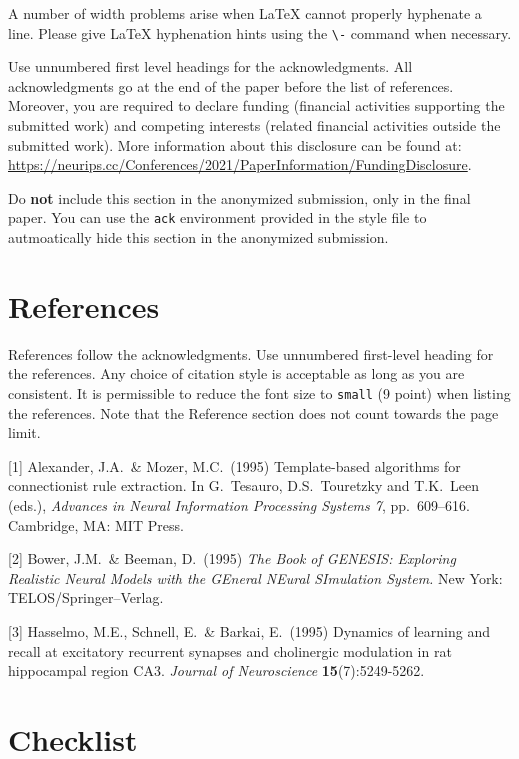 \documentclass{article}
\begin{document}
A number of width problems arise when \LaTeX{} cannot properly hyphenate a
line. Please give LaTeX hyphenation hints using the \verb+\-+ command when
necessary.

\begin{ack}
Use unnumbered first level headings for the acknowledgments. All acknowledgments
go at the end of the paper before the list of references. Moreover, you are required to declare
funding (financial activities supporting the submitted work) and competing interests (related financial activities outside the submitted work).
More information about this disclosure can be found at: \url{https://neurips.cc/Conferences/2021/PaperInformation/FundingDisclosure}.

Do {\bf not} include this section in the anonymized submission, only in the final paper. You can use the \texttt{ack} environment provided in the style file to autmoatically hide this section in the anonymized submission.
\end{ack}

\section*{References}

References follow the acknowledgments. Use unnumbered first-level heading for
the references. Any choice of citation style is acceptable as long as you are
consistent. It is permissible to reduce the font size to \verb+small+ (9 point)
when listing the references.
Note that the Reference section does not count towards the page limit.
\medskip

{
\small

[1] Alexander, J.A.\ \& Mozer, M.C.\ (1995) Template-based algorithms for
connectionist rule extraction. In G.\ Tesauro, D.S.\ Touretzky and T.K.\ Leen
(eds.), {\it Advances in Neural Information Processing Systems 7},
pp.\ 609--616. Cambridge, MA: MIT Press.

[2] Bower, J.M.\ \& Beeman, D.\ (1995) {\it The Book of GENESIS: Exploring
  Realistic Neural Models with the GEneral NEural SImulation System.}  New York:
TELOS/Springer--Verlag.

[3] Hasselmo, M.E., Schnell, E.\ \& Barkai, E.\ (1995) Dynamics of learning and
recall at excitatory recurrent synapses and cholinergic modulation in rat
hippocampal region CA3. {\it Journal of Neuroscience} {\bf 15}(7):5249-5262.
}

\section*{Checklist}
\end{document}
